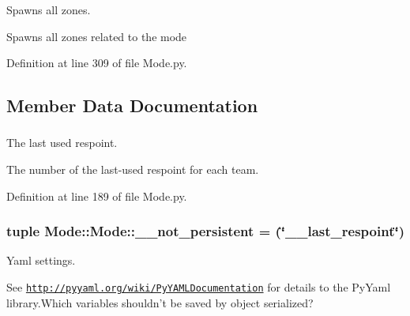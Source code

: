 \-Spawns all zones. 

\-Spawns all zones related to the mode 

\-Definition at line 309 of file \-Mode.\-py.



\subsection{\-Member \-Data \-Documentation}
\hypertarget{class_mode_1_1_mode_a7fa18373a358748a612b8c3e072df277}{
\subsubsection[{\-\_\-\-\_\-last\-\_\-respoint}]{}}
\label{class_mode_1_1_mode_a7fa18373a358748a612b8c3e072df277}


\-The last used respoint. 

\-The number of the last-\/used respoint for each team. 

\-Definition at line 189 of file \-Mode.\-py.

\hypertarget{class_mode_1_1_mode_adfe25df1aa03155f3df6add346ec740c}{
\subsubsection[{\-\_\-\-\_\-not\-\_\-persistent}]{\setlength{\rightskip}{0pt plus 5cm}tuple {\bf \-Mode\-::\-Mode\-::\-\_\-\-\_\-not\-\_\-persistent} = (\char`\"{}\-\_\-\-\_\-last\-\_\-respoint\char`\"{})}}
\label{class_mode_1_1_mode_adfe25df1aa03155f3df6add346ec740c}


\-Yaml settings. 

\-See \href{http://pyyaml.org/wiki/PyYAMLDocumentation}{\tt http\-://pyyaml.\-org/wiki/\-Py\-Y\-A\-M\-L\-Documentation} for details to the \-Py\-Yaml library.\-Which variables shouldn't be saved by object serialized?

